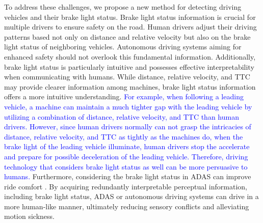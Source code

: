 To address these challenges, we propose a new method for detecting driving vehicles and their brake light status.
Brake light status information is crucial for multiple drivers to ensure safety on the road.
Human drivers adjust their driving patterns based not only on distance and relative velocity but also on the brake light status of neighboring vehicles. 
Autonomous driving systems aiming for enhanced safety should not overlook this fundamental information.
Additionally, brake light status is particularly intuitive and possesses effective interpretability when communicating with humans.
While distance, relative velocity, and TTC may provide clearer information among machines, brake light status information offers a more intuitive understanding.
\textcolor{blue}{
For example, when following a leading vehicle, a machine can maintain a much tighter gap with the leading vehicle by utilizing a combination of distance, relative velocity, and TTC than human drivers.
However, since human drivers normally can not grasp the intricacies of distance, relative velocity, and TTC as tightly as the machines do, when the brake light of the leading vehicle illuminate, human drivers stop the accelerate and prepare for possible deceleration of the leading vehicle.
Therefore, driving technology that considers brake light status as well can be more persuasive to humans.
}
Furthermore, considering the brake light status in ADAS can improve ride comfort \cite{pirhonen2022predictive}.
By acquiring redundantly interpretable perceptual information, including brake light status, ADAS or autonomous driving systems can drive in a more human-like manner, ultimately reducing sensory conflicts and alleviating motion sickness.




